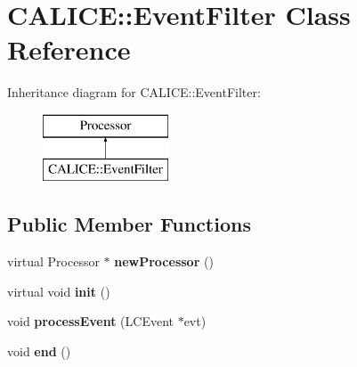 \section{C\-A\-L\-I\-C\-E\-:\-:Event\-Filter Class Reference}
\label{classCALICE_1_1EventFilter}
Inheritance diagram for C\-A\-L\-I\-C\-E\-:\-:Event\-Filter\-:\begin{figure}[H]
\begin{center}
\leavevmode
\includegraphics[height=2.000000cm]{classCALICE_1_1EventFilter}
\end{center}
\end{figure}
\subsection*{Public Member Functions}
\begin{DoxyCompactItemize}
\item 
virtual Processor $\ast$ {\bfseries new\-Processor} ()\label{classCALICE_1_1EventFilter_ad6dafa3730aa71f1b034f2a4bdc365c8}

\item 
virtual void {\bfseries init} ()\label{classCALICE_1_1EventFilter_a9803d6de07c86fd14ec07fa133b4e8fb}

\item 
void {\bfseries process\-Event} (L\-C\-Event $\ast$evt)\label{classCALICE_1_1EventFilter_af72b4ac4b19fbd9dbc785b9462f40704}

\item 
void {\bfseries end} ()\label{classCALICE_1_1EventFilter_ad642b8b6aafb0e7a59c6ed38be3d954d}

\end{DoxyCompactItemize}
